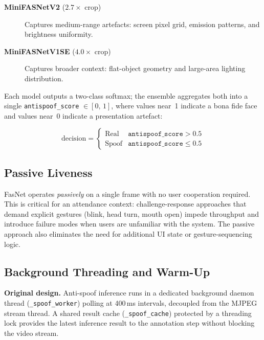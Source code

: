 \documentclass[11pt,a4paper]{article}
\begin{document}
\begin{description}
  \item[\textbf{MiniFASNetV2} ($2.7\times$ crop)] Captures medium-range artefacts:
        screen pixel grid, emission patterns, and brightness uniformity.
  \item[\textbf{MiniFASNetV1SE} ($4.0\times$ crop)] Captures broader context:
        flat-object geometry and large-area lighting distribution.
\end{description}

Each model outputs a two-class softmax; the ensemble aggregates both into a single
\texttt{antispoof\_score} $\in [0,\,1]$, where values near~1 indicate a bona fide
face and values near~0 indicate a presentation artefact:

\begin{equation}
  \text{decision} = \begin{cases}
    \text{Real}  & \texttt{antispoof\_score} > 0.5 \\
    \text{Spoof} & \texttt{antispoof\_score} \leq 0.5
  \end{cases}
  \label{eq:fasnet}
\end{equation}

\subsection{Passive Liveness}

FasNet operates \emph{passively} on a single frame with no user cooperation required.
This is critical for an attendance context: challenge-response approaches that
demand explicit gestures (blink, head turn, mouth open) impede throughput and
introduce failure modes when users are unfamiliar with the system.
The passive approach also eliminates the need for additional UI state or
gesture-sequencing logic.

\subsection{Background Threading and Warm-Up}

\begin{originalbox}
  \textbf{Original design.}
  Anti-spoof inference runs in a dedicated background daemon thread
  (\texttt{\_spoof\_worker}) polling at 400\,ms intervals, decoupled from the
  MJPEG stream thread.
  A shared result cache (\texttt{\_spoof\_cache}) protected by a threading lock
  provides the latest inference result to the annotation step without blocking
  the video stream.
\end{originalbox}
\end{document}
